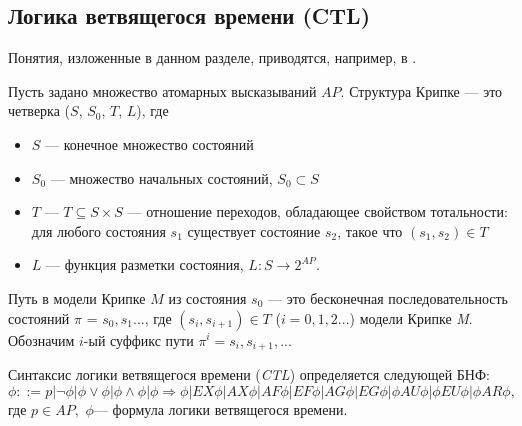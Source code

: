 \documentclass[12pt]{article}
\begin{document}
\subsection{Логика ветвящегося времени (CTL)}
Понятия, изложенные в данном разделе, приводятся, например, в \cite{Clark}.

Пусть задано множество атомарных высказываний $AP$.
Структура Крипке — это четверка ($S$, $S_{0}$, $T$, $L$), где
\begin{itemize}
    \item $S$ — конечное множество состояний
    \item $S_{0}$ — множество начальных состояний, $S_{0} \subset S $
    \item $T$ — $T \subseteq S \times S$ — отношение переходов, обладающее свойством тотальности: для любого состояния $s_1$ существует состояние $s_2$, такое что $(s_1, s_2) \in T$
    \item $L$ — функция разметки состояния, $L: S \rightarrow 2^{AP} $.
\end{itemize}

Путь в модели Крипке $M$ из состояния $s_0$ — это бесконечная последовательность состояний $\pi$ = $s_0, s_1...$, где $(s_{i}, s_{i+1}) \in T$ ($i = 0, 1, 2...$) модели Крипке \textit{M}. 
Обозначим $i$-ый суффикс пути $\pi^{i} = s_{i}, s_{i+1},...$

Синтаксис логики ветвящегося времени (\textit{CTL}) определяется следующей БНФ:
$$\phi ::= p | \neg \phi | \phi \vee \phi | \phi \wedge \phi | 
\phi \Rightarrow \phi| EX\phi | AX\phi | AF\phi | EF\phi | AG\phi | EG\phi | \phi AU \phi|\phi EU \phi| \phi AR \phi,$$
где $p \in AP,$ $\phi$— формула логики ветвящегося времени.
\end{document}

